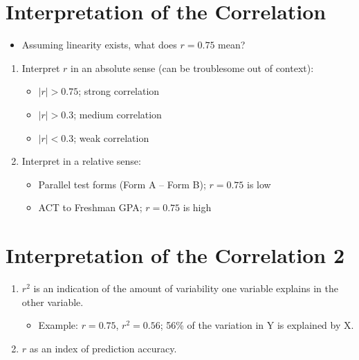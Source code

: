 \documentclass[12pt]{article}
\begin{document}
\section{Interpretation of the
Correlation}\label{interpretation-of-the-correlation}

\begin{itemize}
\itemsep1pt\parskip0pt
\item
  Assuming linearity exists, what does \(r = 0.75\) mean?
\end{itemize}

\begin{enumerate}
\def\labelenumi{\arabic{enumi}.}
\itemsep1pt\parskip0pt
\item
  Interpret \(r\) in an absolute sense (can be troublesome out of
  context):

  \begin{itemize}
  \itemsep1pt\parskip0pt
  \item
    \(| r | > 0.75\); strong correlation
  \item
    \(| r | > 0.3\); medium correlation
  \item
    \(| r | < 0.3\); weak correlation
  \end{itemize}
\item
  Interpret in a relative sense:

  \begin{itemize}
  \itemsep1pt\parskip0pt
  \item
    Parallel test forms (Form A -- Form B); \(r = 0.75\) is low
  \item
    ACT to Freshman GPA; \(r = 0.75\) is high
  \end{itemize}
\end{enumerate}

\section{Interpretation of the Correlation
2}\label{interpretation-of-the-correlation-2}

\begin{enumerate}
\def\labelenumi{\arabic{enumi}.}
\setcounter{enumi}{2}
\itemsep1pt\parskip0pt
\item
  \(r^2\) is an indication of the amount of variability one variable
  explains in the other variable.

  \begin{itemize}
  \itemsep1pt\parskip0pt
  \item
    Example: \(r = 0.75\), \(r^2 = 0.56\); 56\% of the variation in Y is
    explained by X.
  \end{itemize}
\item
  \(r\) as an index of prediction accuracy.
\end{enumerate}
\end{document}

